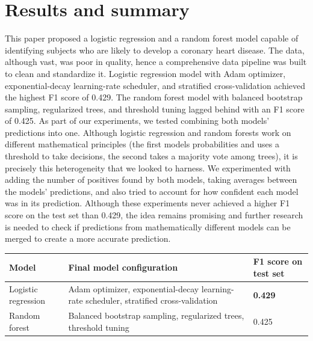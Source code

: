 \documentclass[10pt,conference,compsocconf]{IEEEtran}
\begin{document}
\section{Results and summary}
This paper proposed a logistic regression and a random forest model capable of identifying subjects who are likely to develop a coronary heart disease. The data, although vast, was poor in quality, hence a comprehensive data pipeline was built to clean and standardize it. Logistic regression model with Adam optimizer, exponential-decay learning-rate scheduler, and stratified cross-validation achieved the highest F1 score of 0.429. The random forest model with balanced bootstrap sampling, regularized trees, and threshold tuning lagged behind with an F1 score of 0.425. As part of our experiments, we tested combining both models' predictions into one. Although logistic regression and random forests work on different mathematical principles (the first models probabilities and uses a threshold to take decisions, the second takes a majority vote among trees), it is precisely this heterogeneity that we looked to harness. We experimented with adding the number of positives found by both models, taking averages between the models' predictions, and also tried to account for how confident each model was in its prediction. Although these experiments never achieved a higher F1 score on the test set than 0.429, the idea remains promising and further research is needed to check if predictions from mathematically different models can be merged to create a more accurate prediction. 

\begin{table}[!h]
  \centering
  \begin{tabular}[c]{|l|p{35mm}|l|}
    \hline
    Model&Final model configuration&F1 score on test set\\
    \hline
    Logistic regression&Adam optimizer, exponential-decay learning-rate scheduler, stratified cross-validation&\textbf{0.429}\\
    \hline
    Random forest&Balanced bootstrap sampling, regularized trees, threshold tuning&0.425\\
    \hline
  \end{tabular}
  \label{tab:results}
\end{table}

\newpage


\end{document}
